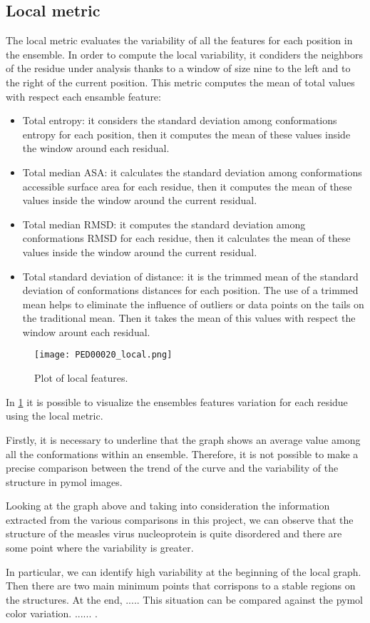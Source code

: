 \subsection{Local metric}
The local metric evaluates the variability of all the features for each position in the ensemble.
In order to compute the local variability, it condiders the neighbors of the residue under analysis thanks to a window of size nine to the left and to the right of the current position.
This metric computes the mean of total values with respect each ensamble feature: 

\begin{itemize}
\item Total entropy: it considers the standard deviation among conformations entropy for each position, then it computes the mean of these values inside the window around each residual.
\item Total median ASA: it calculates the standard deviation among conformations accessible surface area for each residue, then it computes the mean of these values inside the window around the current residual.
\item Total median RMSD: it computes the standard deviation among conformations RMSD for each residue, then it calculates the mean of these values inside the window around the current residual.
\item Total standard deviation of distance: it is the trimmed mean of the standard deviation of conformations distances for each position. 
The use of a trimmed mean helps to eliminate the influence of outliers or data points on the tails on the traditional mean. Then it takes the mean of this values with respect the window arount each residual.
\end{itemize}

\begin{figure}[H]
	\begin{minipage}[b]{0.97\textwidth}
		\centering
		\texttt{[image: PED00020\_local.png]}
		\caption{Plot of local features.}
		\label{plot}
	\end{minipage}	
\end{figure}

In \ref{plot} it is possible to visualize the ensembles features variation for each residue using the local metric. 

\medskip
Firstly, it is necessary to underline that the graph shows an average value among all the conformations within an ensemble. Therefore, it is not possible to make a precise comparison between the trend of the curve and the variability of the structure in pymol images. 

Looking at the graph above and taking into consideration the information extracted from the various comparisons in this project, we can observe that the structure of the measles virus nucleoprotein is quite disordered and there are some point where the variability is greater. 

In particular, we can identify high variability at the beginning of the local graph. Then there are two main minimum points that corrispons to a stable regions on the structures. At the end, .....
This situation can be compared against the pymol color variation. ...... 
. 
